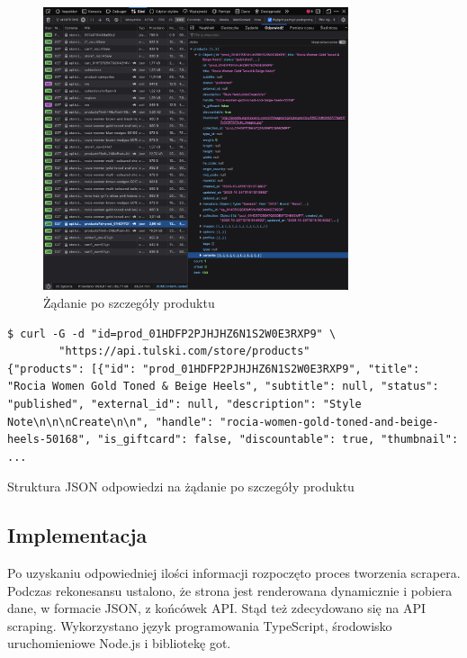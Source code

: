 \begin{figure}[H]
    \centering
    \includegraphics[width=0.8\textwidth]{img/store-get-product-details}
    \caption{Żądanie po szczegóły produktu}
    \label{fig:store-get-product-details}
\end{figure}
\begin{listing}[H]
    \begin{verbatim}
$ curl -G -d "id=prod_01HDFP2PJHJHZ6N1S2W0E3RXP9" \
        "https://api.tulski.com/store/products"
{"products": [{"id": "prod_01HDFP2PJHJHZ6N1S2W0E3RXP9", "title": "Rocia Women Gold Toned & Beige Heels", "subtitle": null, "status": "published", "external_id": null, "description": "Style Note\n\n\nCreate\n\n", "handle": "rocia-women-gold-toned-and-beige-heels-50168", "is_giftcard": false, "discountable": true, "thumbnail": ...
    \end{verbatim}
    \caption{Struktura JSON odpowiedzi na żądanie po szczegóły produktu}
    \label{lst:store-get-product-details-request}
\end{listing}

\subsection{Implementacja}\label{subsec:scraper-implementation}

Po uzyskaniu odpowiedniej ilości informacji rozpoczęto proces tworzenia scrapera.
Podczas rekonesansu ustalono, że strona jest renderowana dynamicznie i pobiera dane, w formacie JSON, z końcówek API\@.
Stąd też zdecydowano się na API scraping.
Wykorzystano język programowania TypeScript, środowisko uruchomieniowe Node.js i bibliotekę got.


